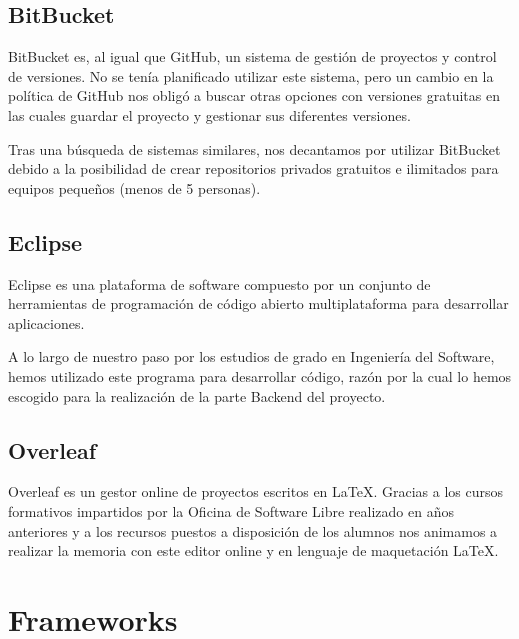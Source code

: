      \subsection{BitBucket}
     BitBucket es, al igual que GitHub, un sistema de gestión de proyectos y control de versiones. No se tenía planificado utilizar este sistema, pero un cambio en la política de GitHub nos obligó a buscar otras opciones con versiones gratuitas en las cuales guardar el proyecto y gestionar sus diferentes versiones.
     \newline
     
     Tras una búsqueda de sistemas similares, nos decantamos por utilizar BitBucket debido a la posibilidad de crear repositorios privados gratuitos e ilimitados para equipos pequeños (menos de 5 personas).
     
     \subsection{Eclipse}
     Eclipse es una plataforma de software compuesto por un conjunto de herramientas de programación de código abierto multiplataforma para desarrollar aplicaciones\cite{eclipse}.
     \newline
     
     A lo largo de nuestro paso por los estudios de grado en Ingeniería del Software, hemos utilizado este programa para desarrollar código, razón por la cual lo hemos escogido para la realización de la parte Backend del proyecto.
     
     
     \subsection{Overleaf}
     Overleaf es un gestor online de proyectos escritos en \LaTeX. Gracias a los cursos formativos impartidos por la Oficina de Software Libre\cite{ucmsoftwarelibre} realizado en años anteriores y a los recursos puestos a disposición de los alumnos\cite{recursoslatex} nos animamos a realizar la memoria con este editor online y en lenguaje de maquetación \LaTeX.
     
     \section{Frameworks}
     